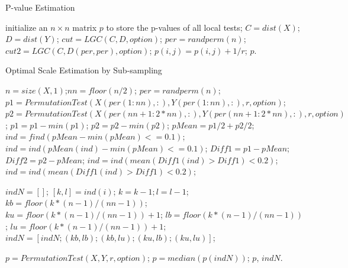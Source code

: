 \documentclass[11pt]{article}
\begin{document}
\begin{algorithm}
\caption{P-value Estimation}
\label{algPerm}
\begin{algorithmic}
\State initialize an $n \times n$ matrix $p$ to store the p-values of all local tests;
\State $C=dist(X)$; $D=dist(Y)$; 
\State $cut=LGC(C,D,option)$; 
\State $per=randperm(n)$; 
\State $cut2=LGC(C,D(per,per),option)$; 
\State $p(i,j)=p(i,j)+1/r$;
\EndIf
\EndFor
\EndFor
\EndFor
\State \Return $p$.
\EndFunction
\end{algorithmic}
\end{algorithm}

\begin{algorithm}
\caption{Optimal Scale Estimation by Sub-sampling}
\label{algSplitPerm}
\begin{algorithmic}
\State $n=size(X,1)$;$nn=floor(n/2)$; 
\State $per=randperm(n)$;
\State $p1=PermutationTest(X(per(1:nn),:),Y(per(1:nn),:),r,option)$;
\State $p2=PermutationTest(X(per(nn+1:2*nn),:),Y(per(nn+1:2*nn),:),r,option)$;
\State $p1=p1-min(p1)$; $p2=p2-min(p2)$; 
\State $pMean=p1/2+p2/2$; 
\State $ind=find(pMean-min(pMean)<=0.1)$; 
\Else
\State $ind=ind(pMean(ind)-min(pMean)<=0.1)$; 
\EndIf
\State $Diff1=p1-pMean$; $Diff2=p2-pMean$;
\State $ind=ind(mean(Diff1(ind)>Diff1)<0.2)$; 
\State $ind=ind(mean(Diff1(ind)>Diff1)<0.2)$; 
\EndFor

\State $indN=[]$; 
\State $[k,l]=ind(i)$; 
\State $k=k-1; l=l-1$; 
\State $kb=floor(k*(n-1)/(nn-1))$; $ku=floor(k*(n-1)/(nn-1))+1$; 
\State $lb=floor(k*(n-1)/(nn-1))$; $lu=floor(k*(n-1)/(nn-1))+1$; 
\State $indN=[indN;(kb,lb);(kb,lu);(ku,lb);(ku,lu)]$; 
\EndFor

\State $p=PermutationTest(X,Y,r,option)$;
\State $p=median(p(indN))$; 
\State \Return $p$, $indN$.
\EndFunction
\end{algorithmic}
\end{algorithm}
\end{document}
